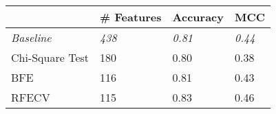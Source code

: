 \begin{tabular}{llll}
\toprule
        & \textbf{\# Features}   & \textbf{Accuracy} & \textbf{MCC}  \\
\midrule
\textit{Baseline}               & \textit{438}           & \textit{0.81}     & \textit{0.44} \\
Chi-Square Test                 & 180                    & 0.80              & 0.38          \\
BFE   & 116                    &  0.81            & 0.43          \\
RFECV & 115              & 0.83    & 0.46          \\
\bottomrule
\end{tabular}
